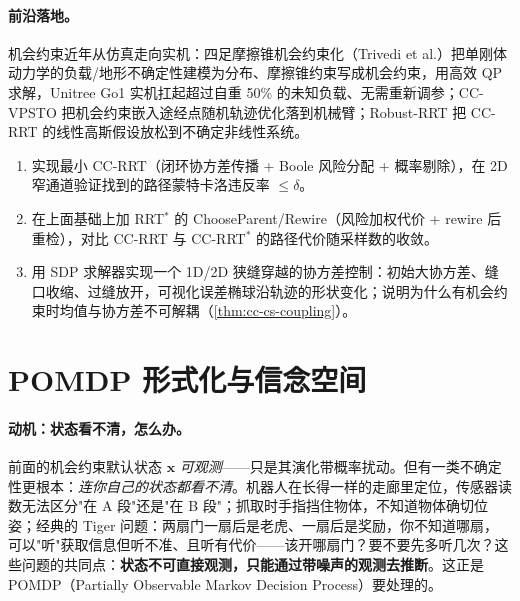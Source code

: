 \paragraph{前沿落地。}
机会约束近年从仿真走向实机：四足摩擦锥机会约束化（Trivedi et al.\cite{trivedi2025friction}）把单刚体动力学的负载/地形不确定性建模为分布、摩擦锥约束写成机会约束，用高效 QP 求解，Unitree Go1 实机扛起超过自重 50\% 的未知负载、无需重新调参；CC-VPSTO 把机会约束嵌入途经点随机轨迹优化落到机械臂；Robust-RRT 把 CC-RRT 的线性高斯假设放松到不确定非线性系统。

\begin{practice}
\begin{enumerate}
  \item 实现最小 CC-RRT（闭环协方差传播 + Boole 风险分配 + 概率剔除），在 2D 窄通道验证找到的路径蒙特卡洛违反率 $\le\delta$。
  \item 在上面基础上加 RRT$^*$ 的 ChooseParent/Rewire（风险加权代价 + rewire 后重检），对比 CC-RRT 与 CC-RRT$^*$ 的路径代价随采样数的收敛。
  \item 用 SDP 求解器实现一个 1D/2D 狭缝穿越的协方差控制：初始大协方差、缝口收缩、过缝放开，可视化误差椭球沿轨迹的形状变化；说明为什么有机会约束时均值与协方差不可解耦（\cref{thm:cc-cs-coupling}）。
\end{enumerate}
\end{practice}

\section{POMDP 形式化与信念空间}
\label{sec:pomdp-belief}

\paragraph{动机：状态看不清，怎么办。}
前面的机会约束默认状态 $\mathbf{x}$ \emph{可观测}——只是其演化带概率扰动。但有一类不确定性更根本：\emph{连你自己的状态都看不清}。机器人在长得一样的走廊里定位，传感器读数无法区分"在 A 段"还是"在 B 段"；抓取时手指挡住物体，不知道物体确切位姿；经典的 Tiger 问题\cite{kaelbling1998planning}：两扇门一扇后是老虎、一扇后是奖励，你不知道哪扇，可以"听"获取信息但听不准、且听有代价——该开哪扇门？要不要先多听几次？这些问题的共同点：\textbf{状态不可直接观测，只能通过带噪声的观测去推断}。这正是 POMDP（Partially Observable Markov Decision Process）要处理的。

